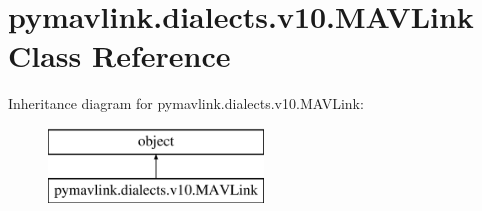 \hypertarget{classpymavlink_1_1dialects_1_1v10_1_1MAVLink}{}\section{pymavlink.\+dialects.\+v10.\+M\+A\+V\+Link Class Reference}
\label{classpymavlink_1_1dialects_1_1v10_1_1MAVLink}
Inheritance diagram for pymavlink.\+dialects.\+v10.\+M\+A\+V\+Link\+:\begin{figure}[H]
\begin{center}
\leavevmode
\includegraphics[height=2.000000cm]{classpymavlink_1_1dialects_1_1v10_1_1MAVLink}
\end{center}
\end{figure}
